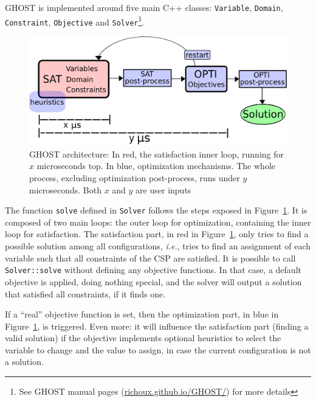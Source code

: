 \documentclass[journal]{IEEEtran}
\newcommand{\csp}{\textsc{CSP}\xspace}
\newcommand{\ghost}{\textsc{GHOST}\xspace}
\newcommand{\ie}{\textit{i.e.}}
\begin{document}
\ghost is implemented around five main C++ classes: \texttt{Variable},
\texttt{Domain},    \texttt{Constraint},     \texttt{Objective}    and
\texttt{Solver}\footnote{See        \ghost         manual        pages
  (\href{http://richoux.github.io/GHOST/}{richoux.github.io/GHOST/})
  for more  details}. %
\begin{figure}[th]
  \centering
  \includegraphics[width=\columnwidth]{figs/archi4.png}
  \caption{\ghost architecture:  In red, the satisfaction  inner loop,
    running  for   $x$  microseconds   top.   In   blue,  optimization
    mechanisms.    The    whole   process,    excluding   optimization
    post-process, runs under $y$ microseconds. Both $x$ and $y$ are user inputs}
  \label{fig:archi}
\end{figure}

The  function \texttt{solve}  defined in  \texttt{Solver} follows  the
steps exposed  in Figure~\ref{fig:archi}. It  is composed of  two main
loops: the outer loop for  optimization, containing the inner loop for
satisfaction.      The     satisfaction     part,    in     red     in
Figure~\ref{fig:archi}, only  tries to find a  possible solution among
all configurations, \ie, tries to  find an assignment of each variable
such that all constraints of the \csp are satisfied. It is possible to
call \texttt{Solver::solve} without  defining any objective functions.
In that case,  a default objective is applied,  doing nothing special,
and the solver will output  a solution that satisfied all constraints,
if it finds one.

If a ``real'' objective function  is set, then the optimization part,
in blue  in Figure~\ref{fig:archi}, is  triggered. Even more:  it will
influence  the satisfaction  part (finding  a valid  solution) if  the
objective  implements optional  heuristics to  select the  variable to
change and the value to assign,  in case the current configuration is not a
solution.
\end{document}
